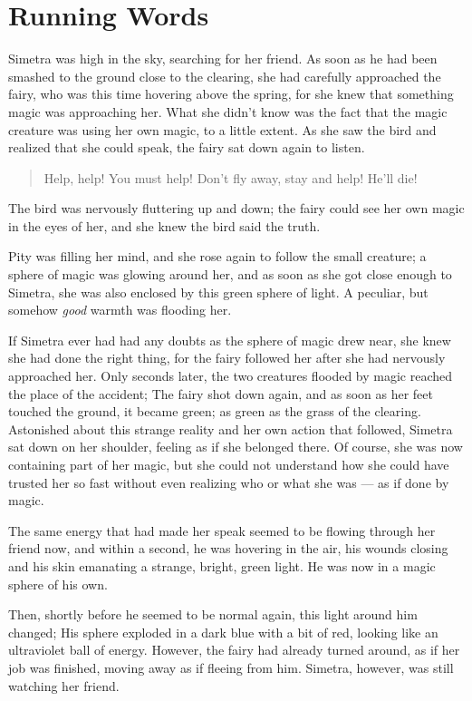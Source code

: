 \chapter{Running Words}
\label{cha:running-words}
Simetra was high in the sky, searching for her friend. As soon as he had been smashed to the ground close to the clearing, she had carefully approached the fairy, who was this time hovering above the spring, for she knew that something magic was approaching her. What she didn't know was the fact that the magic creature was using her own magic, to a little extent. As she saw the bird and realized that she could speak, the fairy sat down again to listen.
\begin{quote}
Help, help! You must help! Don't fly away, stay and help! He'll die!  
\end{quote}
The bird was nervously fluttering up and down; the fairy could see her own magic in the eyes of her, and she knew the bird said the truth.

Pity was filling her mind, and she rose again to follow the small creature; a sphere of magic was glowing around her, and as soon as she got close enough to Simetra, she was also enclosed by this green sphere of light. A peculiar, but somehow \emph{good} warmth was flooding her.

\fancybreaker{}

If Simetra ever had had any doubts as the sphere of magic drew near, she knew she had done the right thing, for the fairy followed her after she had nervously approached her. Only seconds later, the two creatures flooded by magic reached the place of the accident; The fairy shot down again, and as soon as her feet touched the ground, it became green; as green as the grass of the clearing. Astonished about this strange reality and her own action that followed, Simetra sat down on her shoulder, feeling as if she belonged there. Of course, she was now containing part of her magic, but she could not understand how she could have trusted her so fast without even realizing who or what she was --- as if done by magic.

The same energy that had made her speak seemed to be flowing through her friend now, and within a second, he was hovering in the air, his wounds closing and his skin emanating a strange, bright, green light. He was now in a magic sphere of his own.

Then, shortly before he seemed to be normal again, this light around him changed; His sphere exploded in a dark blue with a bit of red, looking like an ultraviolet ball of energy. However, the fairy had already turned around, as if her job was finished, moving away as if fleeing from him. Simetra, however, was still watching her friend.

